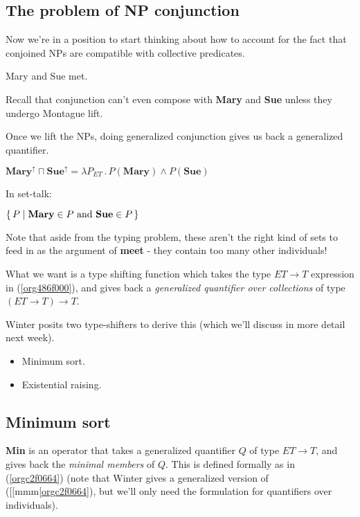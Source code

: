 \documentclass[letterpaper,parskip=half]{scrartcl}
\begin{document}
\subsection{The problem of NP conjunction}
\label{sec:org367dfa3}

Now we're in a position to start thinking about how to account for the fact that conjoined NPs are compatible with collective predicates.

\begin{exe}
\ex Mary and Sue met.
\label{org6ce102b}
\end{exe}

Recall that conjunction can't even compose with \textbf{Mary} and \textbf{Sue} unless they undergo Montague lift.

Once we lift the NPs, doing generalized conjunction gives us back a generalized quantifier.

\begin{exe}
\ex \(\mathbf{Mary}^\uparrow \sqcap \mathbf{Sue}^\uparrow = \lambda P_{ET}\,.\,P(\mathbf{Mary}) \wedge P(\mathbf{Sue})\)
\label{org486f000}
\end{exe}

In set-talk:

\begin{exe}
\ex \(\set{P |\mathbf{Mary} \in P \text{ and }\mathbf{Sue} \in P}\)
\label{org6e83990}
\end{exe}

Note that aside from the typing problem, these aren't the right kind of sets to feed in as the argument of \textbf{meet} - they contain too many other individuals!

What we want is a type shifting function which takes the type \(ET \to T\) expression in (\ref{org486f000}), and gives back a \emph{generalized quantifier over collections} of type \((ET \to T) \to T\).

Winter posits two type-shifters to derive this (which we'll discuss in more detail next week).

\begin{itemize}
\item Minimum sort.
\item Existential raising.
\end{itemize}

\subsection{Minimum sort}
\label{sec:org7e978ef}

\textbf{Min} is an operator that takes a generalized quantifier \(Q\) of type \(ET \to T\), and gives back the \emph{minimal members} of \(Q\). This is defined formally as in (\ref{orgc2f0664}) (note that Winter gives a generalized version of ([[mmm\ref{orgc2f0664}), but we'll only need the formulation for quantifiers over individuals).
\end{document}
